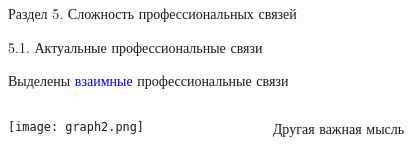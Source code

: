 \begin{frame}{Раздел 5. Сложность профессиональных связей}

{\large 5.1. Актуальные профессиональные связи}

\small
Выделены \textcolor{blue}{взаимные} профессиональные связи

\begin{columns}[T] %
\begin{column}{0.7\textwidth} %
\centering
          \texttt{[image: graph2.png]}
\end{column}
\begin{column}{0.3\textwidth} %
Другая важная мысль
\end{column}
\end{columns}
\end{frame}


